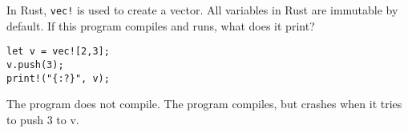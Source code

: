 %
%
In Rust, \texttt{vec!} is used to create a vector. All variables in Rust are immutable by default. If this program compiles and runs, what does it print?
\begin{lstlisting}
let v = vec![2,3];
v.push(3);
print!("{:?}", v);
\end{lstlisting}

\choice {[2,3,2]}
\choice {[2,2,2,3]}
\choice The program does not compile.
\choice The program compiles, but crashes when it tries to push 3 to v.

